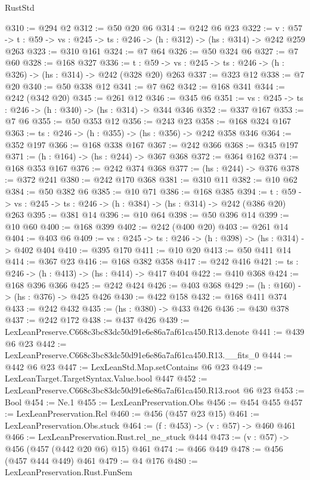 \begin{lexlean}{RustStd}
\begin{coremodule}
@310 := @294 @2
@312 := @50 @20 @6
@314 := @242 @6 @23
@322 := {v : @57} ->
  {t : @59} -> {vs : @245} -> {ts : @246} -> (h : @312) -> (hs : @314) -> @242 @259 @263
@323 := @310 @161
@324 := @7 @64
@326 := @50 @324 @6
@327 := @7 @60
@328 := @168 @327
@336 := {t : @59} -> {vs : @245} -> {ts : @246} -> (h : @326) -> (hs : @314) -> @242 (@328 @20) @263
@337 := @323 @12
@338 := @7 @20
@340 := @50 @338 @12
@341 := @7 @62
@342 := @168 @341
@344 := @242 (@342 @20)
@345 := @261 @12
@346 := @345 @6
@351 := {vs : @245} -> {ts : @246} -> (h : @340) -> (hs : @314) -> @344 @346
@352 := @337 @167
@353 := @7 @6
@355 := @50 @353 @12
@356 := @243 @23
@358 := @168 @324 @167
@363 := {ts : @246} -> (h : @355) -> (hs : @356) -> @242 @358 @346
@364 := @352 @197
@366 := @168 @338 @167
@367 := @242 @366
@368 := @345 @197
@371 := (h : @164) -> (hs : @244) -> @367 @368
@372 := @364 @162
@374 := @168 @353 @167
@376 := @242 @374 @368
@377 := (hs : @244) -> @376
@378 := @372 @241
@380 := @242 @170 @368
@381 := @310 @11
@382 := @10 @62
@384 := @50 @382 @6
@385 := @10 @71
@386 := @168 @385
@394 := {t : @59} -> {vs : @245} -> {ts : @246} -> (h : @384) -> (hs : @314) -> @242 (@386 @20) @263
@395 := @381 @14
@396 := @10 @64
@398 := @50 @396 @14
@399 := @10 @60
@400 := @168 @399
@402 := @242 (@400 @20)
@403 := @261 @14
@404 := @403 @6
@409 := {vs : @245} -> {ts : @246} -> (h : @398) -> (hs : @314) -> @402 @404
@410 := @395 @170
@411 := @10 @20
@413 := @50 @411 @14
@414 := @367 @23
@416 := @168 @382 @358
@417 := @242 @416
@421 := {ts : @246} -> (h : @413) -> (hs : @414) -> @417 @404
@422 := @410 @368
@424 := @168 @396 @366
@425 := @242 @424
@426 := @403 @368
@429 := (h : @160) -> (hs : @376) -> @425 @426
@430 := @422 @158
@432 := @168 @411 @374
@433 := @242 @432
@435 := (hs : @380) -> @433 @426
@436 := @430 @378
@437 := @242 @172
@438 := @437 @426
@439 := LexLeanPreserve.C668c3bc83dc50d91e6e86a7af61ca450.R13.denote
@441 := @439 @6 @23
@442 := LexLeanPreserve.C668c3bc83dc50d91e6e86a7af61ca450.R13.__fits_0
@444 := @442 @6 @23
@447 := LexLeanStd.Map.setContains @6 @23
@449 := LexLeanTarget.TargetSyntax.Value.bool @447
@452 := LexLeanPreserve.C668c3bc83dc50d91e6e86a7af61ca450.R13.root @6 @23
@453 := Bool
@454 := Ne.{1}
@455 := LexLeanPreservation.Obs
@456 := @454 @455
@457 := LexLeanPreservation.Rel
@460 := @456 (@457 @23 @15)
@461 := LexLeanPreservation.Obs.stuck
@464 := (f : @453) -> (v : @57) -> @460 @461
@466 := LexLeanPreservation.Rust.rel_ne_stuck @444
@473 := (v : @57) -> @456 (@457 (@442 @20 @6) @15) @461
@474 := @466 @449
@478 := @456 (@457 @444 @449) @461
@479 := @4 @176
@480 := LexLeanPreservation.Rust.FunSem

\end{coremodule}
\end{lexlean}
